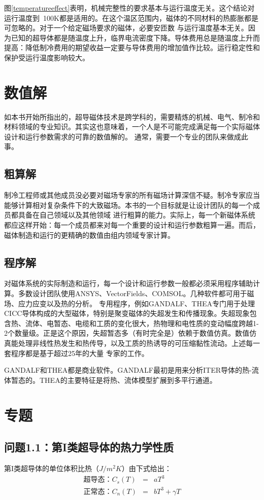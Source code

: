 图\ref{temperatureeffect}表明，机械完整性的要求基本与运行温度无关。这个结论对运行温度到~100K都是适用的。在这个温区范围内，磁体的不同材料的热膨胀都是可忽略的。对于一个给定磁场要求的磁体，必要安匝数
与运行温度基本无关。因为已知的超导体都是随温度上升，临界电流密度下降。导体费用总是随温度上升而提高：降低制冷费用的期望收益一定要与导体费用的增加值作比较。运行稳定性和保护受运行温度影响较大。

\section{数值解}
如本书开始所指出的，超导磁体技术是跨学科的，需要精炼的机械、电气、制冷和材料领域的专业知识。其实这也意味着，一个人是不可能完成满足每一个实际磁体设计和运行参数需求的可靠的数值解的。
通常，需要一个专业的团队来做成此事。
\subsection{粗算解}
制冷工程师或其他成员没必要对磁场专家的所有磁场计算深信不疑。制冷专家应当能够计算相对复杂条件下的大致磁场。本书的一个目标就是让设计团队的每一个成员都具备在自己领域以及其他领域
进行粗算的能力。实际上，每一个新磁体系统都应这样开始：每一个成员都来对每一个重要的设计和运行参数粗算一遍。而后，磁体制造和运行的更精确的数值由组内领域专家计算。

\subsection{程序解}
对磁体系统的实际制造和运行，每一个设计和运行参数一般都必须采用程序辅助计算。多数设计团队使用ANSYS、VectorFields、COMSOL。几种软件都可用于磁场、应力应变以及热的分析。
专用程序，例如GANDALF、THEA专门用于处理CICC导体构成的大型磁体，特别是聚变磁体的失超发生和传播现象。失超现象包含热、流体、电暂态、电缆和工质的变化很大，热物理和电性质的变动幅度跨越1-2个数量级。正是这个原因，失超暂态多（有时完全是）依赖于数值仿真。数值仿真能处理非线性热发生和热传导，以及工质的热诱导的可压缩黏性流动。上述每一套程序都是基于超过25年的大量
专家的工作。

GANDALF和THEA都是商业软件。GANDALF最初是用来分析ITER导体的热-流体暂态的。THEA的主要特征是将热、流体模型扩展到多平行通道。

\section{专题}
\subsection{问题1.1：第I类超导体的热力学性质}
第I类超导体的单位体积比热（$J/m^2K$）由下式给出：
\begin{eqnarray}\label{eqn:1.4ab}
\mbox{超导态：} C_s(T) &=& aT^3 \\ \nonumber
\mbox{正常态：} C_n(T)&=& bT^3+\gamma T
\end{eqnarray}

